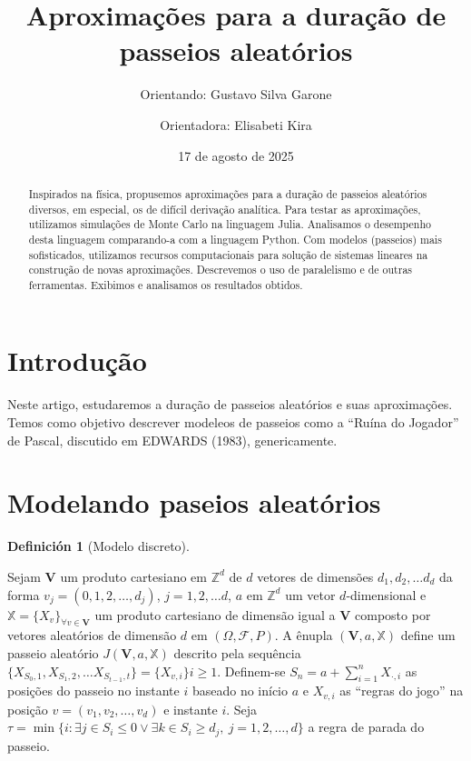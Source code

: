 \documentclass[
  spanish,
  12pt,
]{article}
\title{Aproximações para a duração de passeios aleatórios}
\author{Orientando: Gustavo Silva Garone \and Orientadora: Elisabeti
Kira}
\date{17 de agosto de 2025}
\theoremstyle{definition}
\theoremstyle{definition}
\newtheorem{definition}{Definición}[section]
\theoremstyle{remark}
\begin{document}
\maketitle
\begin{abstract}
Inspirados na física, propusemos aproximações para a duração de passeios
aleatórios diversos, em especial, os de difícil derivação analítica.
Para testar as aproximações, utilizamos simulações de Monte Carlo na
linguagem Julia. Analisamos o desempenho desta linguagem comparando-a
com a linguagem Python. Com modelos (passeios) mais sofisticados,
utilizamos recursos computacionais para solução de sistemas lineares na
construção de novas aproximações. Descrevemos o uso de paralelismo e de
outras ferramentas. Exibimos e analisamos os resultados obtidos.
\end{abstract}


\section{Introdução}\label{introduuxe7uxe3o}

Neste artigo, estudaremos a duração de passeios aleatórios e suas
aproximações. Temos como objetivo descrever modeleos de passeios como a
``Ruína do Jogador'' de Pascal, discutido em EDWARDS (1983),
genericamente.

\section{Modelando paseios
aleatórios}\label{modelando-paseios-aleatuxf3rios}

\begin{definition}[Modelo
discreto]\protect\hypertarget{def-modelodiscreto}{}\label{def-modelodiscreto}

Sejam \(\pmb{V}\) um produto cartesiano em \(\mathbb{Z}^d\) de \(d\)
vetores de dimensões \(d_1, d_2, \dots d_d\) da forma
\(v_j =(0, 1, 2, \dots, d_j)\), \(j =
1,2,\ldots d\), \(a\) em \(\mathbb{Z}^d\) um vetor \(d\)-dimensional e
\(\mathbb{X} =
\{X_{v}\}_{\forall v \in \pmb{V}}\) um produto cartesiano de dimensão
igual a \(\pmb{V}\) composto por vetores aleatórios de dimensão \(d\) em
\((\Omega,
\mathscr{F}, P)\). A ênupla \((\pmb{V}, a, \mathbb{X})\) define um
passeio aleatório \(J(\pmb{V},a, \mathbb{X})\) descrito pela sequência
\(\{X_{S_0, 1},
X_{S_1, 2}, \dots X_{S_{t-1}, t}\} = \{X_{v, i}\}{i\geq1}\). Definem-se
\(S_n = a
+\sum^n_{i=1} X_{\cdot, i}\) as posições do passeio no instante \(i\)
baseado no início \(a\) e \(X_{v, i}\) as ``regras do jogo'' na posição
\(v = (v_1, v_2, \dots,
v_d)\) e instante \(i\). Seja
\(\tau = \min\{i : \exists j \in S_i \leq 0 \lor
\exists k \in S_i \geq d_j,\ j = 1, 2, \dots, d\}\) a regra de parada do
passeio.

\end{definition}
\end{document}
